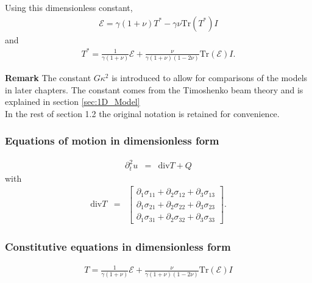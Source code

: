 \documentclass[../../main.tex]{subfiles}
\begin{document}
Using this dimensionless constant,
\begin{eqnarray}
	\mathcal{E} = \gamma(1+\nu)T^* - \gamma\nu \textrm{Tr}(T^*)I \label{DM_H_E}
\end{eqnarray}
and
\begin{eqnarray}
	T^* = \frac{1}{\gamma(1+\nu)}\mathcal{E} + \frac{\nu}{\gamma(1+\nu)(1-2\nu)}\textrm{Tr}(\mathcal{E})I. \label{DM_H_T}
\end{eqnarray}

\textbf{Remark} The constant $G\kappa^2$ is introduced to allow for comparisons of the models in later chapters. The constant comes from the Timoshenko beam theory and is explained in section \ref{sec:1D_Model} \\

In the rest of section 1.2 the original notation is retained for convenience.

\subsubsection*{Equations of motion in dimensionless form}\label{sssec:3D_Model:EquationOfMotionDimensionless}
\begin{eqnarray}
	\partial_t^2 u & = & \textrm{div}T + Q \label{eq:3D_Model:EM-D}
\end{eqnarray}
with
\begin{eqnarray}
	\textrm{div}  T & = &
	\begin{bmatrix}
		\partial_1 \sigma_{11} + \partial_2 \sigma_{12} + \partial_3 \sigma_{13} \\
		\partial_1 \sigma_{21} + \partial_2 \sigma_{22} + \partial_3 \sigma_{23} \\
		\partial_1 \sigma_{31} + \partial_2 \sigma_{32} + \partial_3 \sigma_{33}
	\end{bmatrix}.\label{eq:3D_Model:divT-D}
\end{eqnarray}

\subsubsection*{Constitutive equations in dimensionless form}\label{sssec:3D_Model:ConstitutiveEquationsDimensionless}
\begin{eqnarray}
	T = \frac{1}{\gamma(1+\nu)} \mathcal{E} + \frac{\nu}{\gamma(1+\nu)(1-2\nu)}\textrm{Tr}(\mathcal{E})I \label{eq:3D_Model:CE-D}
\end{eqnarray}
\end{document}
